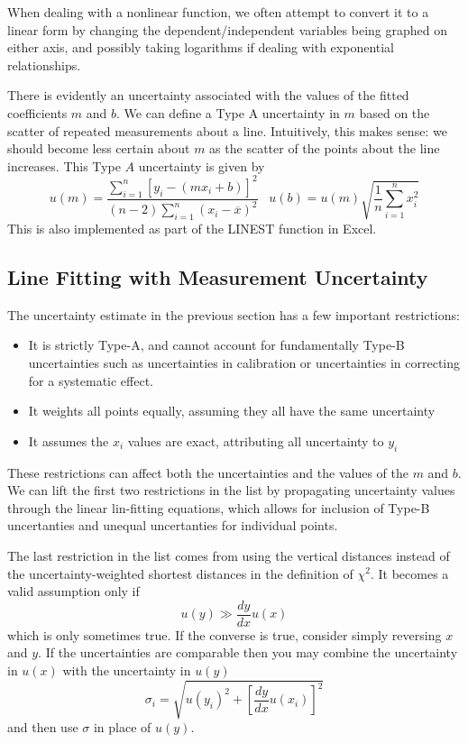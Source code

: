 \documentclass[12pt, a4paper, oneside, openright, titlepage]{book}
\begin{document}
\begin{appendices}
    When dealing with a nonlinear function, we often attempt to convert it to a linear form by changing the dependent/independent variables being graphed on either axis, and possibly taking logarithms if dealing with exponential relationships.

    There is evidently an uncertainty associated with the values of the fitted coefficients $m$ and $b$. We can define a Type A uncertainty in $m$ based on the scatter of repeated measurements about a line. Intuitively, this makes sense: we should become less certain about $m$ as the scatter of the points about the line increases. This Type $A$ uncertainty is given by $$u(m) = \frac{\sum_{i=1}^n[y_i-(mx_i+b)]^2}{(n-2)\sum_{i=1}^n(x_i-\overline{x})^2}\;\;\;u(b) = u(m)\sqrt{\frac{1}{n}\sum_{i=1}^nx_i^2}$$ This is also implemented as part of the LINEST function in Excel.

    \subsection{Line Fitting with Measurement Uncertainty}

    The uncertainty estimate in the previous section has a few important restrictions:
    \begin{itemize}
        \item It is strictly Type-A, and cannot account for fundamentally Type-B uncertainties such as uncertainties in calibration or uncertainties in correcting for a systematic effect.
        \item It weights all points equally, assuming they all have the same uncertainty
        \item It assumes the $x_i$ values are exact, attributing all uncertainty to $y_i$
    \end{itemize}
    These restrictions can affect both the uncertainties and the values of the $m$ and $b$. We can lift the first two restrictions in the list by propagating uncertainty values through the linear lin-fitting equations, which allows for inclusion of Type-B uncertanties and unequal uncertanties for individual points. 

    The last restriction in the list comes from using the vertical distances instead of the uncertainty-weighted shortest distances in the definition of $\chi^2$. It becomes a valid assumption only if $$u(y) \gg\frac{dy}{dx}u(x)$$ which is only sometimes true. If the converse is true, consider simply reversing $x$ and $y$. If the uncertainties are comparable then you may combine the uncertainty in $u(x)$ with the uncertainty in $u(y)$ $$\sigma_i = \sqrt{u(y_i)^2+\left[\frac{dy}{dx}u(x_i)\right]^2}$$ and then use $\sigma$ in place of $u(y)$.


\end{appendices}
\end{document}
